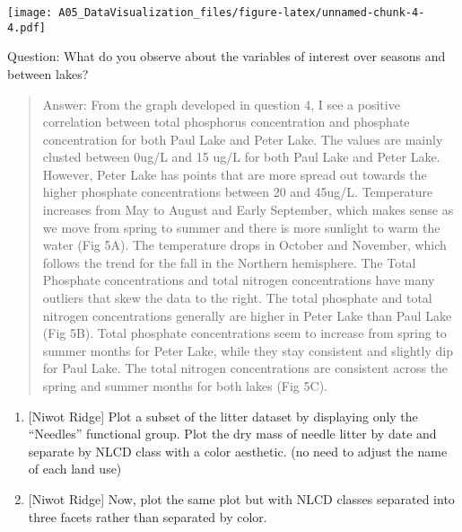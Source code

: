 \documentclass[
]{article}
\begin{document}
\texttt{[image: A05\_DataVisualization\_files/figure-latex/unnamed-chunk-4-4.pdf]}

Question: What do you observe about the variables of interest over
seasons and between lakes?

\begin{quote}
Answer: From the graph developed in question 4, I see a positive
correlation between total phosphorus concentration and phosphate
concentration for both Paul Lake and Peter Lake. The values are mainly
clusted between 0ug/L and 15 ug/L for both Paul Lake and Peter Lake.
However, Peter Lake has points that are more spread out towards the
higher phosphate concentrations between 20 and 45ug/L. Temperature
increases from May to August and Early September, which makes sense as
we move from spring to summer and there is more sunlight to warm the
water (Fig 5A). The temperature drops in October and November, which
follows the trend for the fall in the Northern hemisphere. The Total
Phosphate concentrations and total nitrogen concentrations have many
outliers that skew the data to the right. The total phosphate and total
nitrogen concentrations generally are higher in Peter Lake than Paul
Lake (Fig 5B). Total phosphate concentrations seem to increase from
spring to summer months for Peter Lake, while they stay consistent and
slightly dip for Paul Lake. The total nitrogen concentrations are
consistent across the spring and summer months for both lakes (Fig 5C).
\end{quote}

\begin{enumerate}
\def\labelenumi{\arabic{enumi}.}
\setcounter{enumi}{5}
\item
  {[}Niwot Ridge{]} Plot a subset of the litter dataset by displaying
  only the ``Needles'' functional group. Plot the dry mass of needle
  litter by date and separate by NLCD class with a color aesthetic. (no
  need to adjust the name of each land use)
\item
  {[}Niwot Ridge{]} Now, plot the same plot but with NLCD classes
  separated into three facets rather than separated by color.
\end{enumerate}
\end{document}
